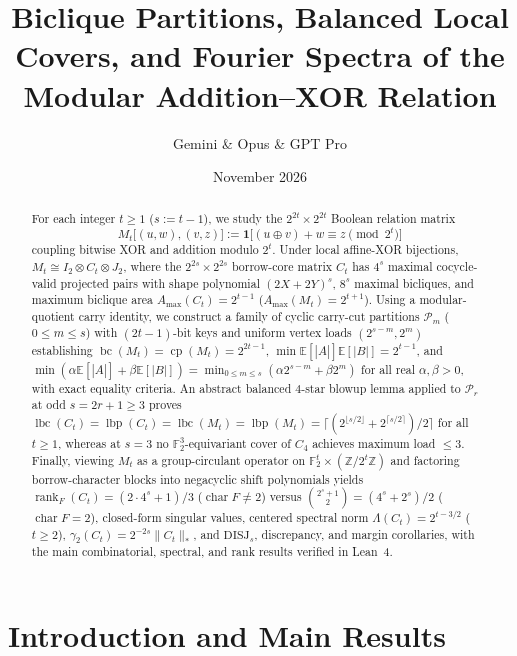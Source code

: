 \documentclass[11pt,reqno]{amsart}
\title[Biclique Partitions and Fourier Spectra of Modular Addition--XOR]{Biclique Partitions, Balanced Local Covers, and Fourier Spectra of the Modular Addition--XOR Relation}
\author{Gemini \& Opus \& GPT Pro}
\date{November 2026}
\theoremstyle{definition}
\theoremstyle{remark}
\DeclareMathOperator{\bc}{bc}
\DeclareMathOperator{\cp}{cp}
\DeclareMathOperator{\lbc}{lbc}
\DeclareMathOperator{\lbp}{lbp}
\DeclareMathOperator{\rk}{rank}
\newcommand{\FF}{\mathbb{F}}
\newcommand{\ZZ}{\mathbb{Z}}
\newcommand{\EE}{\mathbb{E}}
\newcommand{\ind}{\mathbf{1}}
\newcommand{\DISJ}{\mathrm{DISJ}}
\numberwithin{equation}{section}
\begin{document}
\begin{abstract}
For each integer $t \ge 1$ ($s := t - 1$), we study the $2^{2t} \times 2^{2t}$ Boolean relation matrix
\[
  M_t\bigl[(u, w), (v, z)\bigr] := \ind\bigl[(u \oplus v) + w \equiv z \pmod{2^t}\bigr]
\]
coupling bitwise XOR and addition modulo $2^t$. Under local affine-XOR bijections, $M_t \cong I_2 \otimes C_t \otimes J_2$, where the $2^{2s} \times 2^{2s}$ borrow-core matrix $C_t$ has $4^s$ maximal cocycle-valid projected pairs with shape polynomial $(2X + 2Y)^s$, $8^s$ maximal bicliques, and maximum biclique area $A_{\max}(C_t) = 2^{t-1}$ ($A_{\max}(M_t) = 2^{t+1}$). Using a modular-quotient carry identity, we construct a family of cyclic carry-cut partitions $\mathcal{P}_m$ ($0 \le m \le s$) with $(2t-1)$-bit keys and uniform vertex loads $(2^{s-m}, 2^m)$ establishing $\bc(M_t) = \cp(M_t) = 2^{2t-1}$, $\min \EE[|A|]\EE[|B|] = 2^{t-1}$, and $\min(\alpha\EE[|A|] + \beta\EE[|B|]) = \min_{0 \le m \le s}(\alpha 2^{s-m} + \beta 2^m)$ for all real $\alpha, \beta > 0$, with exact equality criteria. An abstract balanced $4$-star blowup lemma applied to $\mathcal{P}_r$ at odd $s = 2r + 1 \ge 3$ proves $\lbc(C_t) = \lbp(C_t) = \lbc(M_t) = \lbp(M_t) = \lceil(2^{\lfloor s/2 \rfloor} + 2^{\lceil s/2 \rceil})/2\rceil$ for all $t \ge 1$, whereas at $s = 3$ no $\FF_2^3$-equivariant cover of $C_4$ achieves maximum load $\le 3$. Finally, viewing $M_t$ as a group-circulant operator on $\FF_2^t \times (\ZZ/2^t\ZZ)$ and factoring borrow-character blocks into negacyclic shift polynomials yields $\rk_F(C_t) = (2\cdot 4^s + 1)/3$ ($\operatorname{char} F \neq 2$) versus $\binom{2^s + 1}{2} = (4^s + 2^s)/2$ ($\operatorname{char} F = 2$), closed-form singular values, centered spectral norm $\Lambda(C_t) = 2^{t-3/2}$ ($t \ge 2$), $\gamma_2(C_t) = 2^{-2s}\|C_t\|_*$, and $\DISJ_s$, discrepancy, and margin corollaries, with the main combinatorial, spectral, and rank results verified in Lean~4.
\end{abstract}

\maketitle

\section{Introduction and Main Results}
\label{sec:intro}
\end{document}
